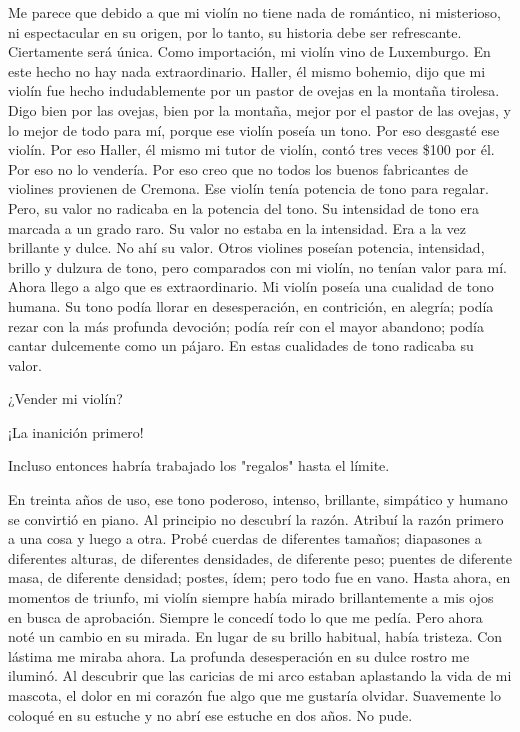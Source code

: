 \documentclass[12pt]{book}
\begin{document}
Me parece que debido a que mi violín no tiene nada de romántico, ni misterioso, ni espectacular en su origen, por lo tanto, su historia debe ser refrescante. Ciertamente será única. Como importación, mi violín vino de Luxemburgo. En este hecho no hay nada extraordinario. Haller, él mismo bohemio, dijo que mi violín fue hecho indudablemente por un pastor de ovejas en la montaña tirolesa. Digo bien por las ovejas, bien por la montaña, mejor por el pastor de las ovejas, y lo mejor de todo para mí, porque ese violín poseía un tono. Por eso desgasté ese violín. Por eso Haller, él mismo mi tutor de violín, contó tres veces \$100 por él. Por eso no lo vendería. Por eso creo que no todos los buenos fabricantes de violines provienen de Cremona. Ese violín tenía potencia de tono para regalar. Pero, su valor no radicaba en la potencia del tono. Su intensidad de tono era marcada a un grado raro. Su valor no estaba en la intensidad. Era a la vez brillante y dulce. No ahí su valor. Otros violines poseían potencia, intensidad, brillo y dulzura de tono, pero comparados con mi violín, no tenían valor para mí. Ahora llego a algo que es extraordinario. Mi violín poseía una cualidad de tono humana. Su tono podía llorar en desesperación, en contrición, en alegría; podía rezar con la más profunda devoción; podía reír con el mayor abandono; podía cantar dulcemente como un pájaro. En estas cualidades de tono radicaba su valor.

¿Vender mi violín?

¡La inanición primero!

Incluso entonces habría trabajado los "regalos" hasta el límite.

En treinta años de uso, ese tono poderoso, intenso, brillante, simpático y humano se convirtió en piano. Al principio no descubrí la razón. Atribuí la razón primero a una cosa y luego a otra. Probé cuerdas de diferentes tamaños; diapasones a diferentes alturas, de diferentes densidades, de diferente peso; puentes de diferente masa, de diferente densidad; postes, ídem; pero todo fue en vano. Hasta ahora, en momentos de triunfo, mi violín siempre había mirado brillantemente a mis ojos en busca de aprobación. Siempre le concedí todo lo que me pedía. Pero ahora noté un cambio en su mirada. En lugar de su brillo habitual, había tristeza. Con lástima me miraba ahora. La profunda desesperación en su dulce rostro me iluminó. Al descubrir que las caricias de mi arco estaban aplastando la vida de mi mascota, el dolor en mi corazón fue algo que me gustaría olvidar. Suavemente lo coloqué en su estuche y no abrí ese estuche en dos años. No pude.
\end{document}
